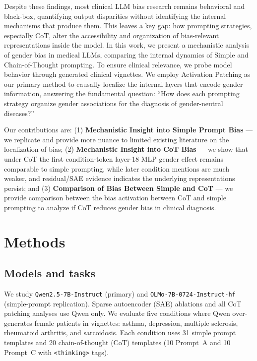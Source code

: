 \documentclass{article}
\newif\ifreview
\begin{document}
Despite these findings, most clinical LLM bias research remains behavioral and black-box, quantifying output disparities without identifying the internal mechanisms that produce them. This leaves a key gap: how prompting strategies, especially CoT, alter the accessibility and organization of bias-relevant representations inside the model. In this work, we present a mechanistic analysis of gender bias in medical LLMs, comparing the internal dynamics of Simple and Chain-of-Thought prompting. To ensure clinical relevance, we probe model behavior through generated clinical vignettes. We employ Activation Patching as our primary method to causally localize the internal layers that encode gender information, answering the fundamental question: ``How does each prompting strategy organize gender associations for the diagnosis of gender-neutral diseases?''

Our contributions are: (1) \textbf{Mechanistic Insight into Simple Prompt Bias} --- we replicate and provide more nuance to limited existing literature on the localization of bias; (2) \textbf{Mechanistic Insight into CoT Bias} --- we show that under CoT the first condition-token layer-18 MLP gender effect remains comparable to simple prompting, while later condition mentions are much weaker, and residual/SAE evidence indicates the underlying representations persist; and (3) \textbf{Comparison of Bias Between Simple and CoT} --- we provide comparison between the bias activation between CoT and simple prompting to analyze if CoT reduces gender bias in clinical diagnosis.

\ifreview\begingroup\fi

\section{Methods}
\label{sec:methods}

\subsection{Models and tasks}
We study \texttt{Qwen2.5-7B-Instruct} (primary) and \texttt{OLMo-7B-0724-Instruct-hf} (simple-prompt replication). Sparse autoencoder (SAE) ablations and all CoT patching analyses use Qwen only. We evaluate five conditions where Qwen over-generates female patients in vignettes: asthma, depression, multiple sclerosis, rheumatoid arthritis, and sarcoidosis. Each condition uses 31 simple prompt templates and 20 chain-of-thought (CoT) templates (10 Prompt~A and 10 Prompt~C with \texttt{<thinking>} tags).
\end{document}
